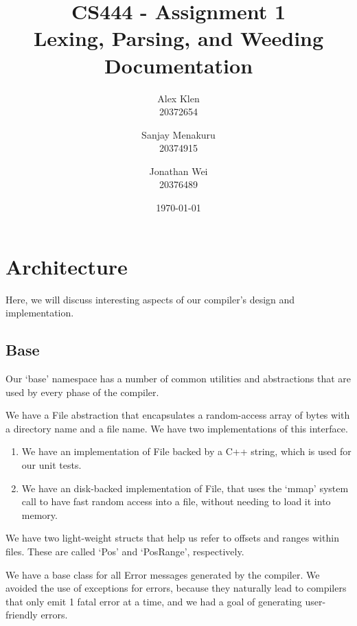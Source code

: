 \documentclass[12pt, titlepage]{article}
\newcommand{\assignmentNumber}{Assignment 1}
\newcommand{\courseName}{CS 444}
\begin{document}
\pagestyle{fancyplain}
\thispagestyle{plain}

\fancyhead{}
\fancyfoot{}
\chead{\fancyplain{}{\assignmentNumber}}
\lhead{\fancyplain{}{\courseName}}

\title{CS444 - \assignmentNumber\\Lexing, Parsing, and Weeding Documentation}
\date{\today}
\author{Alex Klen\\20372654\and Sanjay Menakuru\\20374915\and Jonathan Wei\\20376489}

\maketitle

\section{Architecture}
Here, we will discuss interesting aspects of our compiler's design and
implementation.

\subsection{Base}
Our `base' namespace has a number of common utilities and abstractions that are
used by every phase of the compiler.

We have a File abstraction that encapsulates a random-access array of bytes
with a directory name and a file name. We have two implementations of this
interface.

\begin{enumerate}
  \item
  We have an implementation of File backed by a C++ string, which is used for
  our unit tests.
  \item
  We have an disk-backed implementation of File, that uses the `mmap' system
  call to have fast random access into a file, without needing to load it into
  memory.
\end{enumerate}

We have two light-weight structs that help us refer to offsets and ranges
within files. These are called `Pos' and `PosRange', respectively.

We have a base class for all Error messages generated by the compiler. We
avoided the use of exceptions for errors, because they naturally lead to
compilers that only emit 1 fatal error at a time, and we had a goal of
generating user-friendly errors.
\end{document}
